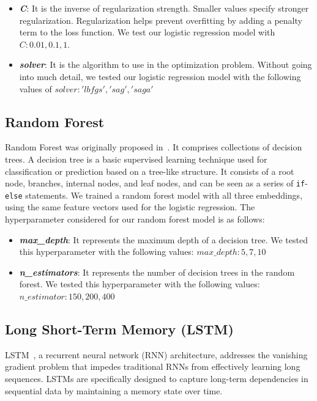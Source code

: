 \documentclass[conference]{IEEEtran}
\begin{document}
\begin{itemize}
    \item \textbf{\textit{C}}: It is the inverse of regularization strength. Smaller values specify stronger regularization. Regularization helps prevent overfitting by adding a penalty term to the loss function. We test our logistic regression model with~$C: {0.01, 0.1, 1}$.
    \item \textbf{\textit{solver}}: It is the algorithm to use in the optimization problem. Without going into much detail, we tested our logistic regression model with the following values of $solver: {'lbfgs', 'sag', 'saga'}$
\end{itemize}

\subsection{Random Forest}
Random Forest was originally proposed in~\cite{randomforestorig}. 
It comprises collections of decision trees. A decision tree is a basic supervised learning technique used for classification or prediction based on a tree-like structure. It consists of a root node, branches, internal nodes, and leaf nodes, and can be seen as a series of \texttt{if}-\texttt{else} statements. We trained a random forest model with all three embeddings, using the same feature vectors used for the logistic regression. The hyperparameter considered for our random forest model is as follows:
\begin{itemize}
    \item \textbf{\textit{max\_depth}}: It represents the maximum depth of a decision tree. We tested this hyperparameter with the following values: $max\_depth: {5, 7, 10}$
    \item \textbf{\textit{n\_estimators}}: It represents the number of decision trees in the random forest. We tested this hyperparameter with the following values: $n\_estimator: {150, 200, 400}$
\end{itemize}

\subsection{Long Short-Term Memory (LSTM)}
LSTM~\cite{lstm}, a recurrent neural network (RNN) architecture, addresses the vanishing gradient problem that impedes traditional RNNs from effectively learning long sequences. LSTMs are specifically designed to capture long-term dependencies in sequential data by maintaining a memory state over time.
\end{document}
